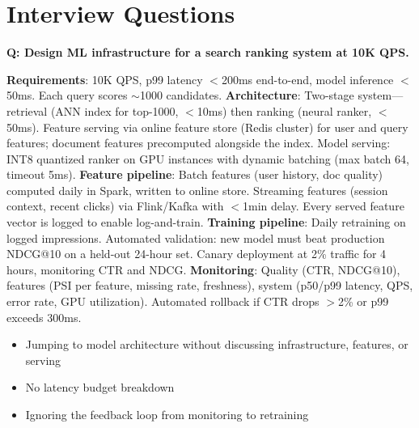 \section{Interview Questions}
\label{sec:production_interview}

\begin{interviewq}
\textbf{Q: Design ML infrastructure for a search ranking system at 10K QPS.}

 \quad {} \quad \badgefreq{\freqhigh}

\stronganswer \textbf{Requirements}: 10K QPS, p99 latency $<$200ms end-to-end, model inference $<$50ms. Each query scores $\sim$1000 candidates. \textbf{Architecture}: Two-stage system---retrieval (ANN index for top-1000, $<$10ms) then ranking (neural ranker, $<$50ms). Feature serving via online feature store (Redis cluster) for user and query features; document features precomputed alongside the index. Model serving: INT8 quantized ranker on GPU instances with dynamic batching (max batch 64, timeout 5ms). \textbf{Feature pipeline}: Batch features (user history, doc quality) computed daily in Spark, written to online store. Streaming features (session context, recent clicks) via Flink/Kafka with $<$1min delay. Every served feature vector is logged to enable log-and-train. \textbf{Training pipeline}: Daily retraining on logged impressions. Automated validation: new model must beat production NDCG@10 on a held-out 24-hour set. Canary deployment at 2\% traffic for 4 hours, monitoring CTR and NDCG. \textbf{Monitoring}: Quality (CTR, NDCG@10), features (PSI per feature, missing rate, freshness), system (p50/p99 latency, QPS, error rate, GPU utilization). Automated rollback if CTR drops $>$2\% or p99 exceeds 300ms.

\redflags
\begin{itemize}
    \item Jumping to model architecture without discussing infrastructure, features, or serving
    \item No latency budget breakdown
    \item Ignoring the feedback loop from monitoring to retraining
\end{itemize}



\end{interviewq}
